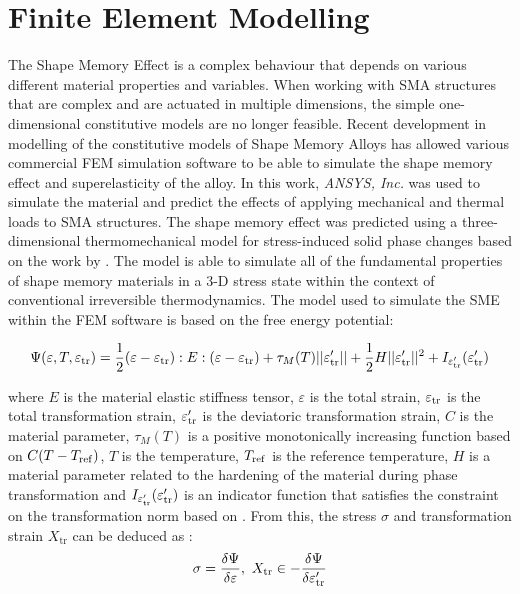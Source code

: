 \section{Finite Element Modelling}
The Shape Memory Effect is a complex behaviour that depends on various different material properties and variables. When working with SMA structures that are complex and are actuated in multiple dimensions, the simple one-dimensional constitutive models are no longer feasible. Recent development in modelling of the constitutive models of Shape Memory Alloys has allowed various commercial FEM simulation software to be able to simulate the shape memory effect and superelasticity of the alloy. In this work, \textit{ANSYS, Inc.} was used to simulate the material and predict the effects of applying mechanical and thermal loads to SMA structures. The shape memory effect was predicted using a three-dimensional thermomechanical model for stress-induced solid phase changes based on the work by \todocite. The model is able to simulate all of the fundamental properties of shape memory materials in a 3-D stress state within the context of conventional irreversible thermodynamics. The model used to simulate the SME within the FEM software is based on the free energy potential:

\begin{equation}
    \label{eq:fem-free-energy}
    \Psi(\varepsilon,T,\varepsilon_\mathrm{tr})=\frac{1}{2}(\varepsilon-\varepsilon_\mathrm{tr}):E:(\varepsilon-\varepsilon_\mathrm{tr})+\tau_M(T)||\varepsilon'_\mathrm{tr}||+\frac{1}{2}H||\varepsilon'_\mathrm{tr}||^2+I_{\varepsilon'_\mathrm{tr}}(\varepsilon'_\mathrm{tr})
\end{equation}

where $E$ is the material elastic stiffness tensor, $\varepsilon$ is the total strain, $\varepsilon_\mathrm{tr}$ is the total transformation strain, $\varepsilon'_\mathrm{tr}$ is the deviatoric transformation strain, $C$ is the material parameter, $\tau_M(T)$ is a positive monotonically increasing function based on $C(T-T_\mathrm{ref})$, $T$ is the temperature, $T_\mathrm{ref}$ is the reference temperature, $H$ is a material parameter related to the hardening of the material during phase transformation and $I_{\varepsilon'_\mathrm{tr}}(\varepsilon'_\mathrm{tr})$ is an indicator function that satisfies the constraint on the transformation norm based on \todocite. From this, the stress $\sigma$ and transformation strain $X_\mathrm{tr}$ can be deduced as :
\begin{equation}
    \label{eq:fem-stress-transf-stress}
    \sigma = \frac{\delta\Psi}{\delta\varepsilon},~X_\mathrm{tr}\in-\frac{\delta\Psi}{\delta\varepsilon'_\mathrm{tr}}
\end{equation}

